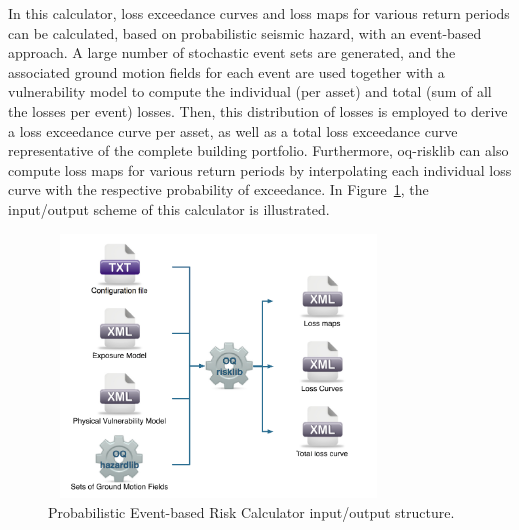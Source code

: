 In this calculator, loss exceedance curves and loss maps for various return periods can be calculated, based on probabilistic seismic hazard, with an event-based approach. A large number of stochastic event sets are generated, and the associated ground motion fields for each event are used together with a vulnerability model to compute the individual (per asset) and total (sum of all the losses per event) losses. Then, this distribution of losses is employed to derive a loss exceedance curve per asset, as well as a total loss exceedance curve representative of the complete building portfolio. Furthermore, oq-risklib can also compute loss maps for various return periods by interpolating each individual loss curve with the respective probability of exceedance. In Figure~\ref{fig:ProbEvent}, the input/output scheme of this calculator is illustrated.

\begin{figure}[ht]
\centering
\includegraphics[width=9cm,height=7cm]{figures/risk/ProbEvent.pdf}
\caption{Probabilistic Event-based Risk Calculator input/output structure.}
\label{fig:ProbEvent}
\end{figure}